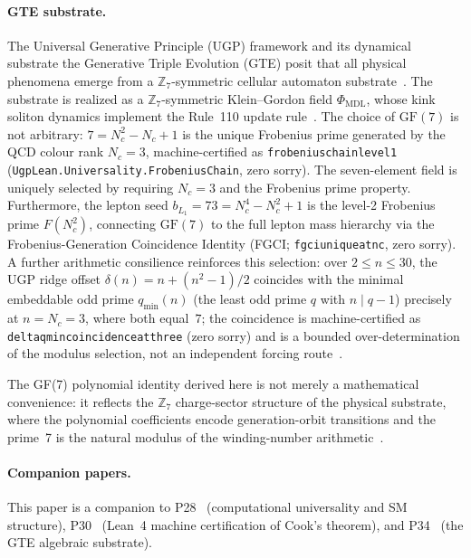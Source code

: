 \documentclass[11pt]{article}
\theoremstyle{remark}
\newcommand{\lean}[1]{%
  \penalty-100
  \begingroup\def\_{\textunderscore\allowbreak}\texttt{#1}\endgroup}
\begin{document}
\paragraph{GTE substrate.}
The Universal Generative Principle (UGP) framework and its dynamical substrate the
Generative Triple Evolution (GTE) posit that all physical phenomena emerge from a
$\mathbb{Z}_7$-symmetric cellular automaton substrate~\cite{SpivackGTEMobius,SpivackGTEUnification}.
The substrate is realized as a $\mathbb{Z}_7$-symmetric Klein--Gordon field
$\Phi_{\mathrm{MDL}}$, whose kink soliton dynamics implement the Rule~110 update
rule~\cite{SpivackCompUniversality}.
The choice of $\mathrm{GF}(7)$ is not arbitrary: $7 = N_c^2 - N_c + 1$ is the unique Frobenius prime generated by the QCD colour rank $N_c = 3$, machine-certified as \lean{frobenius\_chain\_level1} (\texttt{UgpLean.Universality.FrobeniusChain}, zero sorry).
The seven-element field is uniquely selected by requiring $N_c = 3$ and the Frobenius prime property.
Furthermore, the lepton seed $b_{L_1} = 73 = N_c^4 - N_c^2 + 1$ is the level-2 Frobenius prime $F(N_c^2)$, connecting $\mathrm{GF}(7)$ to the full lepton mass hierarchy via the Frobenius-Generation Coincidence Identity (FGCI; \lean{fgci\_unique\_at\_nc}, zero sorry).
A further arithmetic consilience reinforces this selection: over $2 \leq n \leq 30$, the UGP ridge offset $\delta(n) = n + (n^2-1)/2$ coincides with the minimal embeddable odd prime $q_{\min}(n)$ (the least odd prime $q$ with $n \mid q-1$) precisely at $n = N_c = 3$, where both equal~$7$; the coincidence is machine-certified as \lean{delta\_qmin\_coincidence\_at\_three} (zero sorry) and is a bounded over-determination of the modulus selection, not an independent forcing route~\cite{SpivackGTECompleteFramework}.

The GF(7) polynomial identity derived here is not merely a mathematical convenience:
it reflects the $\mathbb{Z}_7$ charge-sector structure of the physical substrate,
where the polynomial coefficients encode generation-orbit transitions and the prime~7
is the natural modulus of the winding-number arithmetic~\cite{SpivackGTEUnification}.

\paragraph{Companion papers.}
This paper is a companion to P28~\cite{SpivackCompUniversality} (computational
universality and SM structure), P30~\cite{SpivackCookTheorem} (Lean~4 machine
certification of Cook's theorem), and P34~\cite{SpivackGTEMobius} (the GTE
algebraic substrate).
\end{document}
